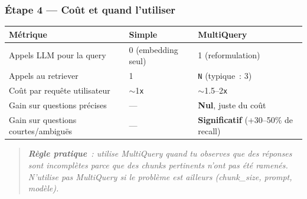 \documentclass[11pt,a4paper]{article}
\begin{document}
\subsubsection*{Étape 4 — Coût et quand l'utiliser}

\begin{center}
\begin{tabular}{p{5cm} p{4cm} p{5cm}}
\toprule
\textbf{Métrique} & \textbf{Simple} & \textbf{MultiQuery} \\
\midrule
Appels LLM pour la query
& 0 (embedding seul)
& 1 (reformulation) \\[1mm]
Appels au retriever
& 1
& \texttt{N} (typique~: 3) \\[1mm]
Coût par requête utilisateur
& \(\sim\)1\texttt{x}
& \(\sim\)1.5--2\texttt{x} \\[1mm]
Gain sur questions précises
& —
& \textbf{Nul}, juste du coût \\[1mm]
Gain sur questions courtes/ambiguës
& —
& \textbf{Significatif} (+30--50\% de recall) \\
\bottomrule
\end{tabular}
\end{center}

\begin{quote}\itshape
\textbf{Règle pratique}~: utilise MultiQuery quand tu observes que des
réponses sont incomplètes \emph{parce que des chunks pertinents n'ont
pas été ramenés}. N'utilise pas MultiQuery si le problème est ailleurs
(chunk\_size, prompt, modèle).
\end{quote}
\end{document}
